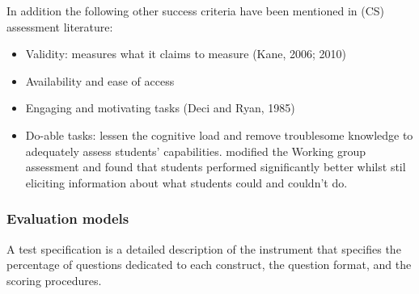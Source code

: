 In addition the following other success criteria have been mentioned in (CS) assessment literature:
\begin{itemize}
\item Validity: measures what it claims to measure (Kane, 2006; 2010)
\item Availability and ease of access \cite{Yadav2015}
\item Engaging and motivating tasks (Deci and Ryan, 1985)
\item Do-able tasks: lessen the cognitive load and remove troublesome knowledge to adequately assess students' capabilities.  modified the \citeauthor{McCracken2001} Working group assessment and found that students performed significantly better whilst stil eliciting information about what students could and couldn't do.

%



\end{itemize}

%




\subsubsection*{Evaluation models}\label{sec:evaluationModels}
A test specification is a detailed description of the instrument that specifies the percentage of questions dedicated to each construct, the question format, and the scoring procedures.

